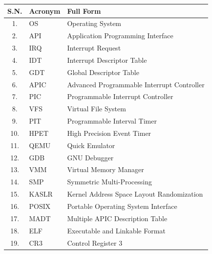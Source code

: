 \documentclass[12pt]{extarticle}
\begin{document}
\begin{table}[H]
    \centering
    \begin{tabular}{|c|p{3.5cm}|p{10cm}|}
        \hline
        \textbf{S.N.} & \textbf{Acronym} & \textbf{Full Form} \\
        \hline
        1. & OS & Operating System \\
        \hline
        2. & API & Application Programming Interface \\
        \hline
        3. & IRQ & Interrupt Request \\
        \hline
        4. & IDT & Interrupt Descriptor Table \\
        \hline
        5. & GDT & Global Descriptor Table \\
        \hline
        6. & APIC & Advanced Programmable Interrupt Controller \\
        \hline
        7. & PIC & Programmable Interrupt Controller \\
        \hline
        8. & VFS & Virtual File System \\
        \hline
        9. & PIT & Programmable Interval Timer \\
        \hline
        10. & HPET & High Precision Event Timer \\
        \hline
        11. & QEMU & Quick Emulator \\
        \hline
        12. & GDB & GNU Debugger \\
        \hline
        13. & VMM & Virtual Memory Manager \\
        \hline
        14. & SMP & Symmetric Multi-Processing \\
        \hline
        15. & KASLR & Kernel Address Space Layout Randomization \\
        \hline
        16. & POSIX & Portable Operating System Interface \\
        \hline
        17. & MADT & Multiple APIC Description Table \\
        \hline
        18. & ELF & Executable and Linkable Format \\
        \hline
        19. & CR3 & Control Register 3 \\
        \hline
    \end{tabular}
\end{table}

\pagebreak

\setcounter{page}{1}

\end{document}
